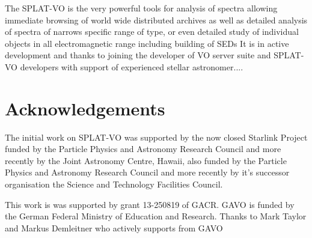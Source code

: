 \documentclass[final,authoryear,5p,times,twocolumn]{elsarticle}
\begin{document}
The SPLAT-VO is the very powerful tools for analysis of spectra allowing immediate browsing of world wide distributed archives as well as detailed analysis of spectra of narrows specific range of type, or even detailed study of individual objects in all electromagnetic range including building of SEDs
It is in active development and thanks to joining the developer of VO server suite and SPLAT-VO developers with support of experienced stellar astronomer....





\section{Acknowledgements}
The initial work on SPLAT-VO  was supported by the now closed
Starlink Project funded by the Particle Physics and Astronomy Research Council
and more recently by the Joint Astronomy Centre, Hawaii, also funded by the
Particle Physics and Astronomy Research Council and more recently by it's
successor organisation the Science and Technology Facilities Council.


This work is was supported by grant 13-250819 of GACR. GAVO is funded by the German Federal Ministry of Education and Research.
Thanks to Mark Taylor and Markus Demleitner who actively supports from
GAVO



\end{document}
